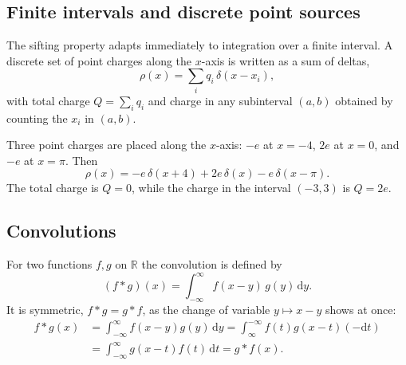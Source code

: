 \subsection{Finite intervals and discrete point sources}

The sifting property adapts immediately to integration over a finite interval. A discrete set of point charges along the $x$-axis is written as a sum of deltas,
\begin{equation}
\rho(x)=\sum_i q_i\,\delta(x-x_i),
\end{equation}
with total charge $Q=\sum_i q_i$ and charge in any subinterval $(a,b)$ obtained by counting the $x_i$ in $(a,b)$.

\begin{example}
Three point charges are placed along the $x$-axis: $-e$ at $x=-4$, $2e$ at $x=0$, and $-e$ at $x=\pi$. Then
\begin{equation}
\rho(x)=-e\,\delta(x+4)+2e\,\delta(x)-e\,\delta(x-\pi).
\end{equation}
The total charge is $Q=0$, while the charge in the interval $(-3,3)$ is $Q=2e$.
\end{example}

\subsection{Convolutions}

For two functions $f,g$ on $\mathbb{R}$ the convolution is defined by
\begin{equation}
(f*g)(x)=\int_{-\infty}^{\infty}f(x-y)\,g(y)\,\mathrm{d}y.
\end{equation}
It is symmetric, $f*g=g*f$, as the change of variable $y\mapsto x-y$ shows at once:
\begin{align}
f*g(x)&=\int_{-\infty}^{\infty}f(x-y)g(y)\,\mathrm{d}y
=\int_{\infty}^{-\infty}f(t)g(x-t)(-\mathrm{d}t)\\
&=\int_{-\infty}^{\infty}g(x-t)f(t)\,\mathrm{d}t=g*f(x).
\end{align}

